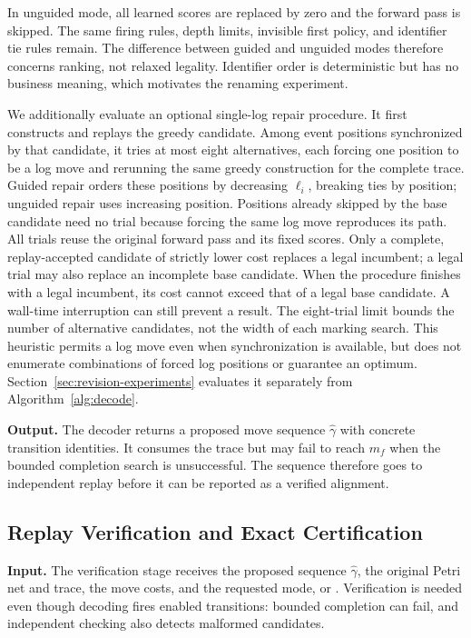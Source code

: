 In unguided mode, all learned scores are replaced by zero and the forward pass is skipped. The same firing rules, depth limits, invisible first policy, and identifier tie rules remain. The difference between guided and unguided modes therefore concerns ranking, not relaxed legality. Identifier order is deterministic but has no business meaning, which motivates the renaming experiment.

\begin{revised}
We additionally evaluate an optional single-log repair procedure. It first constructs and replays the greedy candidate. Among event positions synchronized by that candidate, it tries at most eight alternatives, each forcing one position to be a log move and rerunning the same greedy construction for the complete trace. Guided repair orders these positions by decreasing $\ell_i$, breaking ties by position; unguided repair uses increasing position. Positions already skipped by the base candidate need no trial because forcing the same log move reproduces its path. All trials reuse the original forward pass and its fixed scores. Only a complete, replay-accepted candidate of strictly lower cost replaces a legal incumbent; a legal trial may also replace an incomplete base candidate. When the procedure finishes with a legal incumbent, its cost cannot exceed that of a legal base candidate. A wall-time interruption can still prevent a result. The eight-trial limit bounds the number of alternative candidates, not the width of each marking search. This heuristic permits a log move even when synchronization is available, but does not enumerate combinations of forced log positions or guarantee an optimum. Section~\ref{sec:revision-experiments} evaluates it separately from Algorithm~\ref{alg:decode}.
\end{revised}

\textbf{Output.} The decoder returns a proposed move sequence $\widehat\gamma$ with concrete transition identities. It consumes the trace but may fail to reach $m_f$ when the bounded completion search is unsuccessful. The sequence therefore goes to independent replay before it can be reported as a verified alignment.

\subsection{Replay Verification and Exact Certification}
\label{sec:assurance}

\textbf{Input.} The verification stage receives the proposed sequence $\widehat\gamma$, the original Petri net and trace, the move costs, and the requested mode, \Fast{} or \Certified{}. Verification is needed even though decoding fires enabled transitions: bounded completion can fail, and independent checking also detects malformed candidates.

